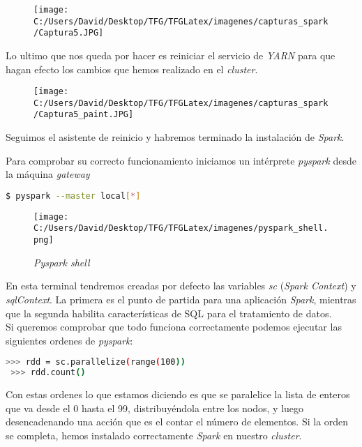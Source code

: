 \begin{figure}[!htpb]
  \centering
  \texttt{[image: C:/Users/David/Desktop/TFG/TFGLatex/imagenes/capturas\_spark/Captura5.JPG]}
\end{figure}

Lo ultimo que nos queda por hacer es reiniciar el servicio de \textit{YARN} para que hagan efecto
los cambios que hemos realizado en el \textit{cluster}.

\begin{figure}[!htpb]
  \centering
  \texttt{[image: C:/Users/David/Desktop/TFG/TFGLatex/imagenes/capturas\_spark/Captura5\_paint.JPG]}
\end{figure}

Seguimos el asistente de reinicio y habremos terminado la instalación de \textit{Spark}.
\newline

Para comprobar su correcto funcionamiento iniciamos un intérprete \textit{pyspark} desde la máquina \textit{gateway}
\begin{lstlisting}[language=bash, numbers=none]
$ pyspark --master local[*]
\end{lstlisting}

\clearpage

\begin{figure}[!htpb]
  \centering
  \texttt{[image: C:/Users/David/Desktop/TFG/TFGLatex/imagenes/pyspark\_shell.png]}
  \caption[\textit{Pyspark shell}]{\textit{Pyspark shell}}
  \label{pyspark_shell}
\end{figure}

En esta terminal tendremos creadas por defecto las variables \textit{sc} (\textit{Spark Context})
y \textit{sqlContext}. La primera es el punto de partida para una aplicación \textit{Spark}, mientras
que la segunda habilita características de SQL para el tratamiento de datos.\\
Si queremos comprobar que todo funciona correctamente podemos ejecutar las siguientes ordenes de \textit{pyspark}:

\begin{lstlisting}[language=bash, numbers=none]
 >>> rdd = sc.parallelize(range(100))
 >>> rdd.count()
\end{lstlisting}

Con estas ordenes lo que estamos diciendo es que se paralelice la lista de enteros que va desde el 0 hasta el 99,
distribuyéndola entre los nodos, y luego desencadenando una acción que es el contar el número de elementos.
Si la orden se completa, hemos instalado correctamente \textit{Spark} en nuestro \textit{cluster}.

